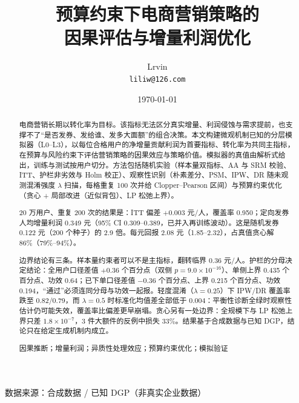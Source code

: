 \documentclass[UTF8, fontset=windows, a4paper, zihao=5]{ctexart}
\newcommand{\paperkeywords}[1]{%
  \par\vspace{8pt}\noindent{\sffamily\bfseries 关键词：}#1\par\vspace{4pt}}
\begin{document}
\title{%
  {\sffamily\bfseries 预算约束下电商营销策略的\\[2pt]
   因果评估与增量利润优化}}
\author{\sffamily Lrvin\\[2pt] \texttt{liliw@126.com}}
\date{\sffamily\today}

\maketitle
\thispagestyle{plain}

\vspace{-16pt}
\begin{center}
\footnotesize\sffamily 数据来源：合成数据 / 已知 DGP（非真实企业数据）
\end{center}
\vspace{-10pt}

\begin{abstract}
\linespread{1.04}\selectfont
\small
电商营销长期以转化率为目标。该指标无法区分真实增量、利润侵蚀与需求提前，也支撑不了“是否发券、发给谁、发多大面额”的组合决策。本文构建微观机制已知的分层模拟器（L0--L3），以每位合格用户的净增量贡献利润为首要指标、转化率为共同主指标，在预算与风险约束下评估营销策略的因果效应与策略价值。模拟器的真值由解析式给出，训练与测试按用户切分。方法包括随机实验（样本量双指标、AA 与 SRM 校验、ITT、护栏非劣效与 Holm 校正）、观察性识别（朴素差分、PSM、IPW、DR 随未观测混淆强度 $\lambda$ 扫描，每格重复 100 次并给 Clopper--Pearson 区间）与预算约束优化（贪心 + 局部改进（近似背包）、LP 松弛上界）。

20 万用户、重复 200 次的结果是：ITT 偏差 $+0.003$ 元/人，覆盖率 0.950；定向发券人均增量利润 0.349 元（95\% CI 0.309--0.389，已并入再训练波动）。这是随机发券 0.122 元（200 个种子）的 2.9 倍。每元回报 2.08 元（1.85--2.32），占真值贪心解 86\%（79\%--94\%）。

边界结论有三条。样本量约束者可以不是主指标，翻转临界 0.36 元/人。护栏的分母决定结论：全用户口径差值 $+0.36$ 个百分点（双侧 $p=9.0\times10^{-16}$）、单侧上界 0.435 个百分点、功效 0.64；已下单口径差值 $-0.36$ 个百分点、上界 0.215 个百分点、功效 0.194，“通过”必须连同分母与功效一起报。轻度混淆（$\lambda=0.25$）下 IPW/DR 覆盖率跌至 0.82/0.79，而 $\lambda=0.5$ 时标准化均值差全部低于 0.004：平衡性诊断全绿时观察性估计仍可能失效，覆盖率比偏差更早崩塌。贪心另有一处边界：全规模下与 LP 松弛上界只差 $1.8\times10^{-7}$，3 件大额件的反例中损失 33\%。结果基于合成数据与已知 DGP，结论只在给定生成机制内成立。

\paperkeywords{因果推断；增量利润；异质性处理效应；预算约束优化；模拟验证}
\end{abstract}
\end{document}
